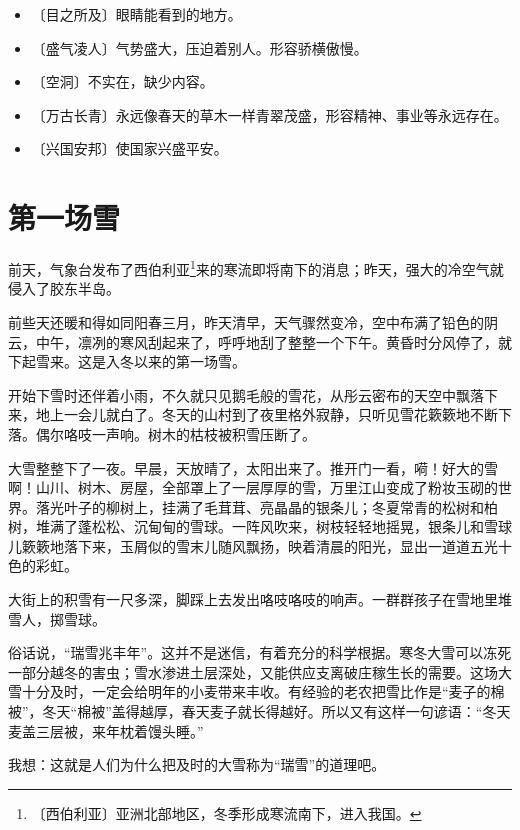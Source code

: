 \documentclass[12pt,UTF-8,openany]{ctexbook}
\begin{document}
\vspace{-1em}

\begin{itemize}
    \setlength\itemsep{-0.2em}
    \item 〔目之所及〕眼睛能看到的地方。
    \item 〔盛气凌人〕气势盛大，压迫着别人。形容骄横傲慢。
    \item 〔空洞〕不实在，缺少内容。
    \item 〔万古长青〕永远像春天的草木一样青翠茂盛，形容精神、事业等永远存在。
    \item 〔兴国安邦〕使国家兴盛平安。
\end{itemize}

\chapter{第一场雪}

\begin{Large}
    
    前天，气象台发布了西伯利亚\footnote{〔西伯利亚〕亚洲北部地区，冬季形成寒流南下，进入我国。}来的寒流即将南下的消息；昨天，强大的冷空气就侵入了胶东半岛。
    
    前些天还暖和得如同阳春三月，昨天清早，天气骤然变冷，空中布满了铅色的阴云，中午，凛冽的寒风刮起来了，呼呼地刮了整整一个下午。黄昏时分风停了，就下起雪来。这是入冬以来的第一场雪。
    
    开始下雪时还伴着小雨，不久就只见鹅毛般的雪花，从彤云密布的天空中飘落下来，地上一会儿就白了。冬天的山村到了夜里格外寂静，只听见雪花簌簌地不断下落。偶尔咯吱一声响。树木的枯枝被积雪压断了。
    
    大雪整整下了一夜。早晨，天放晴了，太阳出来了。推开门一看，嗬！好大的雪啊！山川、树木、房屋，全部罩上了一层厚厚的雪，万里江山变成了粉妆玉砌的世界。落光叶子的柳树上，挂满了毛茸茸、亮晶晶的银条儿；冬夏常青的松树和柏树，堆满了蓬松松、沉甸甸的雪球。一阵风吹来，树枝轻轻地摇晃，银条儿和雪球儿簌簌地落下来，玉屑似的雪末儿随风飘扬，映着清晨的阳光，显出一道道五光十色的彩虹。
    
    大街上的积雪有一尺多深，脚踩上去发出咯吱咯吱的响声。一群群孩子在雪地里堆雪人，掷雪球。
    
    俗话说，“瑞雪兆丰年”。这并不是迷信，有着充分的科学根据。寒冬大雪可以冻死一部分越冬的害虫；雪水渗进土层深处，又能供应支离破庄稼生长的需要。这场大雪十分及时，一定会给明年的小麦带来丰收。有经验的老农把雪比作是“麦子的棉被”，冬天“棉被”盖得越厚，春天麦子就长得越好。所以又有这样一句谚语：“冬天麦盖三层被，来年枕着馒头睡。”
    
    我想：这就是人们为什么把及时的大雪称为“瑞雪”的道理吧。
    
\end{Large}
\end{document}
